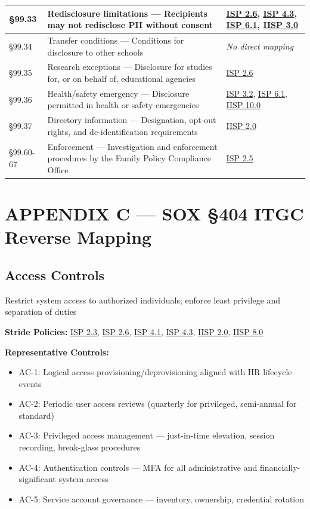\documentclass[11pt,landscape]{article}
\begin{document}
\begin{longtable}{|p{2cm}|p{4.5in}|p{3in}|}
\hline
§99.33 & Redisclosure limitations --- Recipients may not redisclose PII without consent & \hyperref[pol:ISP26]{ISP 2.6}, \hyperref[pol:ISP43]{ISP 4.3}, \hyperref[pol:ISP61]{ISP 6.1}, \hyperref[pol:IISP30]{IISP 3.0} \\
\hline
§99.34 & Transfer conditions --- Conditions for disclosure to other schools & \textit{No direct mapping} \\
\hline
§99.35 & Research exceptions --- Disclosure for studies for, or on behalf of, educational agencies & \hyperref[pol:ISP26]{ISP 2.6} \\
\hline
§99.36 & Health/safety emergency --- Disclosure permitted in health or safety emergencies & \hyperref[pol:ISP32]{ISP 3.2}, \hyperref[pol:ISP61]{ISP 6.1}, \hyperref[pol:IISP100]{IISP 10.0} \\
\hline
§99.37 & Directory information --- Designation, opt-out rights, and de-identification requirements & \hyperref[pol:IISP20]{IISP 2.0} \\
\hline
§99.60-67 & Enforcement --- Investigation and enforcement procedures by the Family Policy Compliance Office & \hyperref[pol:ISP25]{ISP 2.5} \\
\hline
\end{longtable}


\section{APPENDIX C --- SOX \S 404 ITGC Reverse Mapping}
\label{app:sox}

\subsection{Access Controls}

Restrict system access to authorized individuals; enforce least privilege and separation of duties

\textbf{Stride Policies:} \hyperref[pol:ISP23]{ISP 2.3}, \hyperref[pol:ISP26]{ISP 2.6}, \hyperref[pol:ISP41]{ISP 4.1}, \hyperref[pol:ISP43]{ISP 4.3}, \hyperref[pol:IISP20]{IISP 2.0}, \hyperref[pol:IISP80]{IISP 8.0}

\textbf{Representative Controls:}
\begin{itemize}[leftmargin=*]
  \item AC-1: Logical access provisioning/deprovisioning aligned with HR lifecycle events
  \item AC-2: Periodic user access reviews (quarterly for privileged, semi-annual for standard)
  \item AC-3: Privileged access management --- just-in-time elevation, session recording, break-glass procedures
  \item AC-4: Authentication controls --- MFA for all administrative and financially-significant system access
  \item AC-5: Service account governance --- inventory, ownership, credential rotation
\end{itemize}
\end{document}
